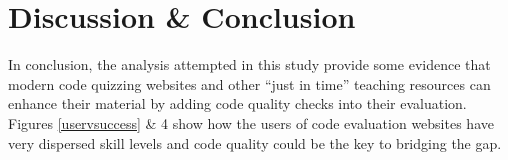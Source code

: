 \documentclass{article}
\begin{document}
\section{Discussion \& Conclusion}\label{discussion-conclusion}

In conclusion, the analysis attempted in this study provide some
evidence that modern code quizzing websites and other ``just in time''
teaching resources can enhance their material by adding code quality
checks into their evaluation. Figures \ref{uservsuccess} \& 4 show how
the users of code evaluation websites have very dispersed skill levels
and code quality could be the key to bridging the gap.



\end{document}
